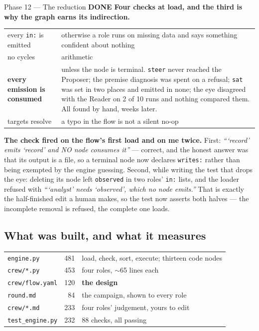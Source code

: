 \documentclass[11pt,a4paper]{article}
\newcommand{\code}[1]{\texttt{#1}}
\newcommand{\done}{\textcolor{good}{\textbf{DONE}}}
\begin{document}
\begin{phasebox}{Phase 12 --- The reduction \hfill \done}
\textbf{Four checks at load, and the third is why the graph earns its indirection.}

\begin{center}\small
\begin{tabular}{lp{7.1cm}}
\toprule
every \code{in:} is emitted & otherwise a role runs on missing data and says something confident
about nothing \\
no cycles & arithmetic \\
\textbf{every emission is consumed} & unless the node is terminal. \code{steer} never reached the
Proposer; the premise diagnosis was spent on a refusal; \code{sat} was set in two places and emitted
in none; the eye disagreed with the Reader on 2 of 10 runs and nothing compared them. All found by
hand, weeks later. \\
targets resolve & a typo in the flow is not a silent no-op \\
\bottomrule
\end{tabular}
\end{center}

\noindent \textbf{The check fired on the flow's first load and on me twice.} First: \emph{```record'
emits `record' and NO node consumes it''} --- correct, and the honest answer was that its output is a
file, so a terminal node now declares \code{writes:} rather than being exempted by the engine
guessing. Second, while writing the test that drops the eye: deleting its node left \code{observed} in
two roles' \code{in:} lists, and the loader refused with \emph{```analyst' needs `observed', which no
node emits.''} That is exactly the half-finished edit a human makes, so the test now asserts both
halves --- the incomplete removal is refused, the complete one loads.

\subsection*{What was built, and what it measures}
\begin{center}\small
\begin{tabular}{lrp{4.5cm}}
\toprule
\code{engine.py}       & 481 & load, check, sort, execute; thirteen code nodes \\
\code{crew/*.py}       & 453 & four roles, $\sim$65 lines each \\
\code{crew/flow.yaml}  & 120 & \textbf{the design} \\
\code{round.md}        &  84 & the campaign, shown to every role \\
\code{crew/*.md}       & 233 & four roles' judgement, yours to edit \\
\code{test\_engine.py} & 232 & 88 checks, all passing \\
\bottomrule
\end{tabular}
\end{center}


\end{phasebox}
\end{document}
